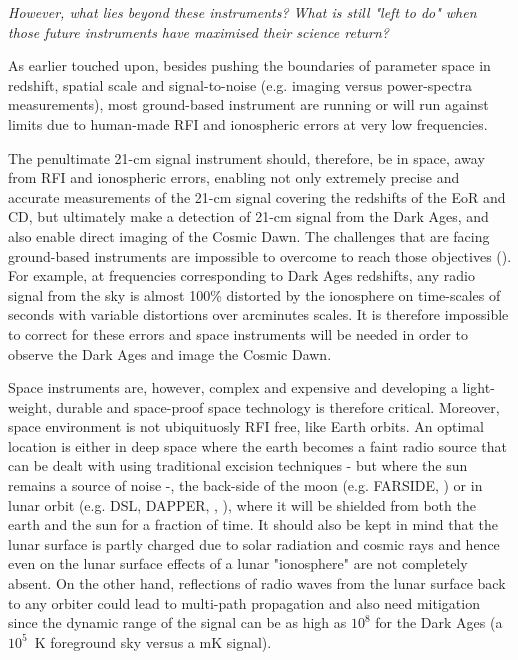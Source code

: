 {\sl However, what lies beyond these instruments? What is still "left to do" when those future instruments have maximised their science return?} 

As earlier touched upon, besides pushing the boundaries of parameter space in redshift, spatial scale and signal-to-noise (e.g. imaging versus power-spectra measurements), most ground-based instrument are running or will run against limits due to human-made RFI and ionospheric errors at very low frequencies. 

The penultimate 21-cm signal instrument should, therefore, be in space, away from RFI and ionospheric errors, enabling not only extremely precise and accurate measurements of the 21-cm signal covering the redshifts of the EoR and CD, but ultimately make a detection of 21-cm signal from the Dark Ages, and also enable direct imaging of the Cosmic Dawn. The challenges that are facing ground-based instruments are impossible to overcome to reach those objectives (\cite{koopmans19}). For example, at frequencies corresponding to Dark Ages redshifts, any radio signal from the sky is almost 100\% distorted by the ionosphere on time-scales of seconds with variable distortions over arcminutes scales. It is therefore impossible to correct for these errors and space instruments will be needed in order to observe the Dark Ages and image the Cosmic Dawn.

Space instruments are, however, complex and expensive and developing a light-weight, durable and space-proof space technology is therefore critical. Moreover, space environment is not ubiquituosly RFI free, like Earth orbits. An optimal location is either in deep space where the earth becomes a faint radio source that can be dealt with using traditional excision techniques - but where the sun remains a source of noise -, the back-side of the moon (e.g. FARSIDE, \cite{burns19b}) or in lunar orbit (e.g. DSL, DAPPER, \cite{chen19}, \cite{burns19}), where it will be shielded from both the earth and the sun for a fraction of time.
It should also be kept in mind that the lunar surface is partly charged due to solar radiation and cosmic rays and hence even on the lunar surface effects of a lunar "ionosphere" are not completely absent. On the other hand, reflections of radio waves from the lunar surface back to any orbiter could lead to multi-path propagation and also need mitigation since the dynamic range of the signal can be as high as $10^8$ for the Dark Ages (a $10^5$~K foreground sky versus a mK signal).
  

